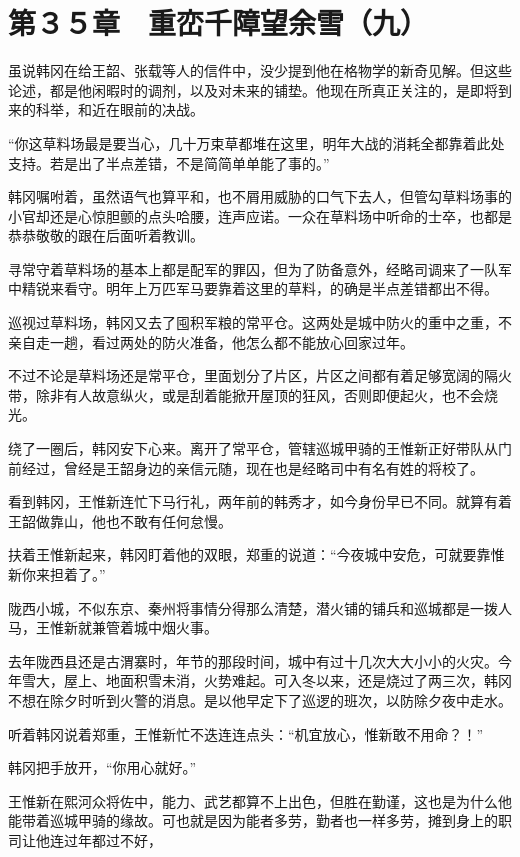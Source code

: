 \section{第３５章　重峦千障望余雪（九）}

虽说韩冈在给王韶、张载等人的信件中，没少提到他在格物学的新奇见解。但这些论述，都是他闲暇时的调剂，以及对未来的铺垫。他现在所真正关注的，是即将到来的科举，和近在眼前的决战。

“你这草料场最是要当心，几十万束草都堆在这里，明年大战的消耗全都靠着此处支持。若是出了半点差错，不是简简单单能了事的。”

韩冈嘱咐着，虽然语气也算平和，也不屑用威胁的口气下去人，但管勾草料场事的小官却还是心惊胆颤的点头哈腰，连声应诺。一众在草料场中听命的士卒，也都是恭恭敬敬的跟在后面听着教训。

寻常守着草料场的基本上都是配军的罪囚，但为了防备意外，经略司调来了一队军中精锐来看守。明年上万匹军马要靠着这里的草料，的确是半点差错都出不得。

巡视过草料场，韩冈又去了囤积军粮的常平仓。这两处是城中防火的重中之重，不亲自走一趟，看过两处的防火准备，他怎么都不能放心回家过年。

不过不论是草料场还是常平仓，里面划分了片区，片区之间都有着足够宽阔的隔火带，除非有人故意纵火，或是刮着能掀开屋顶的狂风，否则即便起火，也不会烧光。

绕了一圈后，韩冈安下心来。离开了常平仓，管辖巡城甲骑的王惟新正好带队从门前经过，曾经是王韶身边的亲信元随，现在也是经略司中有名有姓的将校了。

看到韩冈，王惟新连忙下马行礼，两年前的韩秀才，如今身份早已不同。就算有着王韶做靠山，他也不敢有任何怠慢。

扶着王惟新起来，韩冈盯着他的双眼，郑重的说道：“今夜城中安危，可就要靠惟新你来担着了。”

陇西小城，不似东京、秦州将事情分得那么清楚，潜火铺的铺兵和巡城都是一拨人马，王惟新就兼管着城中烟火事。

去年陇西县还是古渭寨时，年节的那段时间，城中有过十几次大大小小的火灾。今年雪大，屋上、地面积雪未消，火势难起。可入冬以来，还是烧过了两三次，韩冈不想在除夕时听到火警的消息。是以他早定下了巡逻的班次，以防除夕夜中走水。

听着韩冈说着郑重，王惟新忙不迭连连点头：“机宜放心，惟新敢不用命？！”

韩冈把手放开，“你用心就好。”

王惟新在熙河众将佐中，能力、武艺都算不上出色，但胜在勤谨，这也是为什么他能带着巡城甲骑的缘故。可也就是因为能者多劳，勤者也一样多劳，摊到身上的职司让他连过年都过不好，

